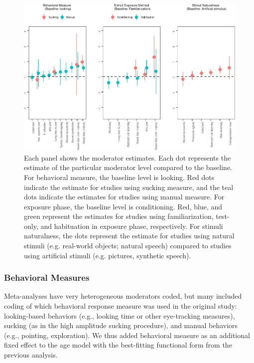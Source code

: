 \documentclass[10pt, letterpaper]{article}
\newenvironment{CodeChunk}{}{}
\begin{document}
\begin{CodeChunk}
\begin{figure}[t!]

{\centering \includegraphics{figs/mod_plot-1} 

}

\caption[Each panel shows the moderator estimates]{Each panel shows the moderator estimates. Each dot represents the estimate of the particular moderator level compared to the baseline. For behavioral measure, the baseline level is looking. Red dots indicate the estimate for studies using sucking measure, and the teal dots indicate the estimates for studies using manual measure. For exposure phase, the baseline level is conditioning. Red, blue, and green represent the estimates for studies using familiarization, test-only, and habituation in exposure phase, respectively. For stimuli naturalness, the dots represent the estimate for studies using natural stimuli (e.g. real-world objects; natural speech) compared to studies using artificial stimuli (e.g. pictures, synthetic speech).}\label{fig:mod_plot}
\end{figure}
\end{CodeChunk}

\hypertarget{behavioral-measures}{%
\subsubsection{Behavioral Measures}\label{behavioral-measures}}

Meta-analyses have very heterogeneous moderators coded, but many
included coding of which behavioral response measure was used in the
original study: looking-based behaviors (e.g., looking time or other
eye-tracking measures), sucking (as in the high amplitude sucking
procedure), and manual behaviors (e.g., pointing, exploration). We thus
added behavioral measure as an additional fixed effect to the age model
with the best-fitting functional form from the previous analysis.
\end{document}

